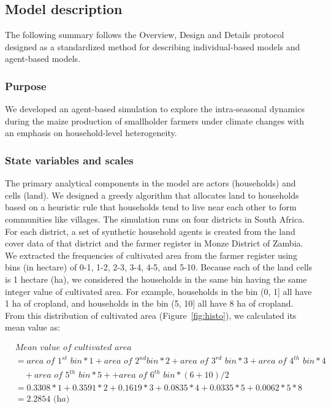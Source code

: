 \documentclass[11pt, titlepage]{article}
\begin{document}
\subsection{\large Model description}

The following summary follows the Overview, Design and Details protocol \citep{grimm_standard_2006,polhill_using_2008} designed as a standardized method for describing individual-based models and agent-based models.

\subsubsection{Purpose} 
We developed an agent-based simulation to explore the intra-seasonal dynamics during the maize production of smallholder farmers under climate changes with an emphasis on household-level heterogeneity.

\subsubsection{State variables and scales} 
The primary analytical components in the model are actors (households) and cells (land). We designed a greedy algorithm that allocates land to households based on a heuristic rule that households tend to live near each other to form communities like villages. The simulation runs on four districts in South Africa. For each district, a set of synthetic household agents is created from the land cover data of that district and the farmer register in Monze District of Zambia. We extracted the frequencies of cultivated area from the farmer register using bins (in hectare) of 0-1, 1-2, 2-3, 3-4, 4-5, and 5-10. Because each of the land cells is 1 hectare (ha), we considered the households in the same bin having the same integer value of cultivated area. For example, households in the bin (0, 1] all have 1 ha of cropland, and households in the bin (5, 10] all have 8 ha of cropland. From this distribution of cultivated area (Figure~\ref{fig:histo}), we calculated its mean value as:

\begin{displaymath} 
\begin{split} & \textit{Mean value of cultivated area} \\ 
& = \textit{area of 1}^{st}\textit{ bin} * 1 + \textit{area of 2}^{nd}\textit{bin} * 2 + \textit{area of 3}^{rd}\textit{ bin} * 3 + \textit{area of 4}^{th}\textit{ bin} * 4 \\ 
& \quad  + \textit{area of 5}^{th}\textit{ bin} * 5 + + \textit{area of 6}^{th}\textit{ bin} * (6 + 10)/2 \\ & = 0.3308 *1 + 0.3591 * 2 + 0.1619 * 3 + 0.0835 * 4 + 0.0335 * 5 + 0.0062 * 5 * 8 \\ 
& = 2.2854 \textit{ (ha)} 
\end{split}
\end{displaymath}
\end{document}
